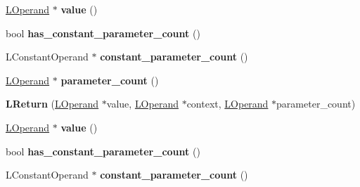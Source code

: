 \begin{DoxyCompactItemize}
\item 
\hyperlink{classv8_1_1internal_1_1_l_operand}{L\+Operand} $\ast$ {\bfseries value} ()\hypertarget{classv8_1_1internal_1_1_l_return_a846c6b559bdc3e68ab7de2472718eff0}{}\label{classv8_1_1internal_1_1_l_return_a846c6b559bdc3e68ab7de2472718eff0}

\item 
bool {\bfseries has\+\_\+constant\+\_\+parameter\+\_\+count} ()\hypertarget{classv8_1_1internal_1_1_l_return_a263e1bd29a12702e4c5fc6214fbe4ca5}{}\label{classv8_1_1internal_1_1_l_return_a263e1bd29a12702e4c5fc6214fbe4ca5}

\item 
L\+Constant\+Operand $\ast$ {\bfseries constant\+\_\+parameter\+\_\+count} ()\hypertarget{classv8_1_1internal_1_1_l_return_a0453fde1ccafc982160182465d2f2e4a}{}\label{classv8_1_1internal_1_1_l_return_a0453fde1ccafc982160182465d2f2e4a}

\item 
\hyperlink{classv8_1_1internal_1_1_l_operand}{L\+Operand} $\ast$ {\bfseries parameter\+\_\+count} ()\hypertarget{classv8_1_1internal_1_1_l_return_ad644e156a714136b62e763b8239f04fc}{}\label{classv8_1_1internal_1_1_l_return_ad644e156a714136b62e763b8239f04fc}

\item 
{\bfseries L\+Return} (\hyperlink{classv8_1_1internal_1_1_l_operand}{L\+Operand} $\ast$value, \hyperlink{classv8_1_1internal_1_1_l_operand}{L\+Operand} $\ast$context, \hyperlink{classv8_1_1internal_1_1_l_operand}{L\+Operand} $\ast$parameter\+\_\+count)\hypertarget{classv8_1_1internal_1_1_l_return_af69be24dc79385d85a6b221138258d67}{}\label{classv8_1_1internal_1_1_l_return_af69be24dc79385d85a6b221138258d67}

\item 
\hyperlink{classv8_1_1internal_1_1_l_operand}{L\+Operand} $\ast$ {\bfseries value} ()\hypertarget{classv8_1_1internal_1_1_l_return_a846c6b559bdc3e68ab7de2472718eff0}{}\label{classv8_1_1internal_1_1_l_return_a846c6b559bdc3e68ab7de2472718eff0}

\item 
bool {\bfseries has\+\_\+constant\+\_\+parameter\+\_\+count} ()\hypertarget{classv8_1_1internal_1_1_l_return_a263e1bd29a12702e4c5fc6214fbe4ca5}{}\label{classv8_1_1internal_1_1_l_return_a263e1bd29a12702e4c5fc6214fbe4ca5}

\item 
L\+Constant\+Operand $\ast$ {\bfseries constant\+\_\+parameter\+\_\+count} ()\hypertarget{classv8_1_1internal_1_1_l_return_a0453fde1ccafc982160182465d2f2e4a}{}\label{classv8_1_1internal_1_1_l_return_a0453fde1ccafc982160182465d2f2e4a}


\end{DoxyCompactItemize}
